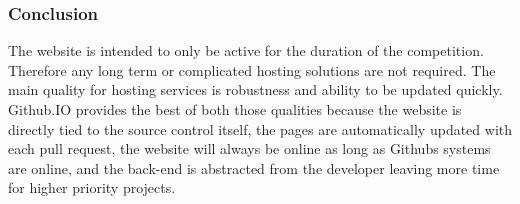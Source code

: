 \documentclass[onecolumn, draftclsnofoot,10pt, compsoc]{IEEEtran}
\begin{document}
    \subsubsection{Conclusion}
    The website is intended to only be active for the duration of the competition. Therefore any long term or complicated hosting solutions are not required. The main quality for hosting services is robustness and ability to be updated quickly. Github.IO provides the best of both those qualities because the website is directly tied to the source control itself, the pages are automatically updated with each pull request, the website will always be online as long as Githubs systems are online, and the back-end is abstracted from the developer leaving more time for higher priority projects.
    
    
    
\end{document}
